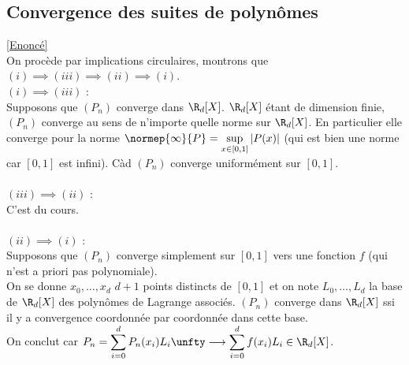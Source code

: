 \documentclass{book}
\begin{document}
	\subsection{Convergence des suites de polynômes }
	\label{Convergence des suites de polynômes Corrigé}
	\textcolor{blue}{\hyperref[Convergence des suites de polynômes]{[Enoncé]}}\\
	On procède par implications circulaires, montrons que $(i)\implies (iii)\implies (ii)\implies (i)$.\\
	$(i)\implies (iii)$ :\\
	Supposons que $(P_n)$ converge dans $\R_d[X]$. $\R_d[X]$ étant de dimension finie, $(P_n)$ converge au sens de n'importe quelle norme sur $\R_d[X]$. En particulier elle converge pour la norme $\normep{\infty}{P}=\sup\limits_{x\in [0,1]}|P(x)|$ (qui est bien une norme car $[0,1]$ est infini). Càd $(P_n)$ converge uniformément sur $[0,1]$.\\\\
	$(iii)\implies (ii)$ :\\
	C'est du cours.\\\\
	$(ii)\implies (i)$ :\\
	Supposons que $(P_n)$ converge simplement sur $[0,1]$ vers une fonction $f$ (qui n'est a priori pas polynomiale).\\
	On se donne $x_0,\dots,x_d$ $d+1$ points distincts de $[0,1]$ et on note $L_0,\dots,L_d$ la base de $\R_d[X]$ des polynômes de Lagrange associés. $(P_n)$ converge dans $\R_d[X]$ ssi il y a convergence coordonnée par coordonnée dans cette base.\\
	On conclut car $P_n=\displaystyle\sum_{i=0}^dP_n(x_i)L_i\unfty\longrightarrow \sum_{i=0}^df(x_i)L_i\in \R_d[X]$.
	
\end{document}
